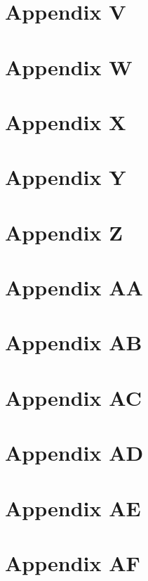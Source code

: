 \chapter{Appendix V}

\chapter{Appendix W}

\chapter{Appendix X}

\chapter{Appendix Y}

\chapter{Appendix Z}

\chapter{Appendix AA}

\chapter{Appendix AB}

\chapter{Appendix AC}

\chapter{Appendix AD}

\chapter{Appendix AE}

\chapter{Appendix AF}

